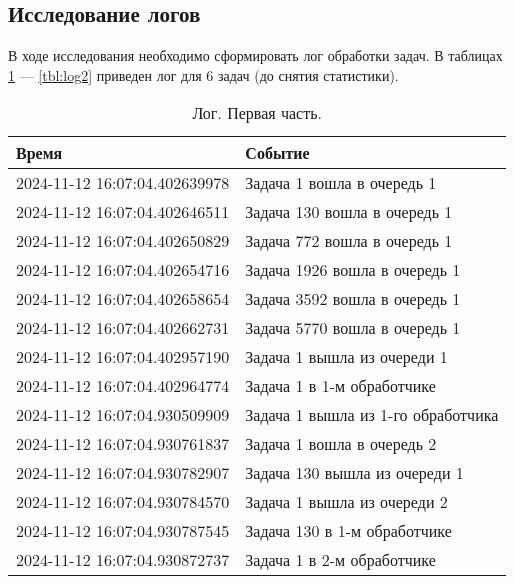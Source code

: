 \subsection{Исследование логов}
В ходе исследования необходимо сформировать лог обработки задач.
В таблицах \ref{tbl:log1} --- \ref{tbl:log2} приведен лог для 6 задач (до снятия статистики).

\begin{table}[h]
	\begin{center}
		\begin{threeparttable}
		\captionsetup{justification=raggedright,singlelinecheck=off}
		\caption{Лог. Первая часть.}
		\label{tbl:log1}
                    \begin{tabular}{|l|l|}
                        \hline
                        Время & Событие\\
                        \hline
                        2024-11-12 16:07:04.402639978 & Задача 1 вошла в очередь 1\\
                        2024-11-12 16:07:04.402646511 & Задача 130 вошла в очередь 1\\
                        2024-11-12 16:07:04.402650829 & Задача 772 вошла в очередь 1\\
                        2024-11-12 16:07:04.402654716 & Задача 1926 вошла в очередь 1\\
                        2024-11-12 16:07:04.402658654 & Задача 3592 вошла в очередь 1\\
                        2024-11-12 16:07:04.402662731 & Задача 5770 вошла в очередь 1\\
                        2024-11-12 16:07:04.402957190 & Задача 1 вышла из очереди 1\\
                        2024-11-12 16:07:04.402964774 & Задача 1 в 1-м обработчике\\
                        2024-11-12 16:07:04.930509909 & Задача 1 вышла из 1-го обработчика\\
                        2024-11-12 16:07:04.930761837 & Задача 1 вошла в очередь 2\\
                        2024-11-12 16:07:04.930782907 & Задача 130 вышла из очереди 1\\
                        2024-11-12 16:07:04.930784570 & Задача 1 вышла из очереди 2\\
                        2024-11-12 16:07:04.930787545 & Задача 130 в 1-м обработчике\\
                        2024-11-12 16:07:04.930872737 & Задача 1 в 2-м обработчике\\

\end{tabular}
\end{threeparttable}
\end{center}
\end{table}
